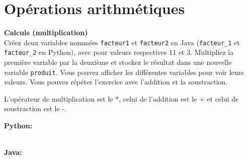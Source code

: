 \section{Opérations arithmétiques}
 \begin{Exercice} \textbf{Calculs (multiplication) }\\
 
    Créez deux variables nommées \texttt{facteur1} et \texttt{facteur2} en Java (\texttt{facteur\_1} et \texttt{facteur\_2} en Python), avec pour valeurs respectives 11 et 3. Multipliez la première variable par la deuxième et stockez le résultat dans une nouvelle variable \texttt{produit}. Vous pouvez afficher les différentes variables pour voir leurs valeurs. Vous pouvez répéter l'exercice avec l'addition et la soustraction. \\
    
     \begin{conseil}
           L'opérateur de multiplication est le *, celui de l'addition est le + et celui de soustraction est le -.
         
     \end{conseil}
     \begin{solution}
     
     \textbf{Python:}
     
     
     \textbf{\\Java:}
     
            
     \end{solution}   
 \end{Exercice}
 
